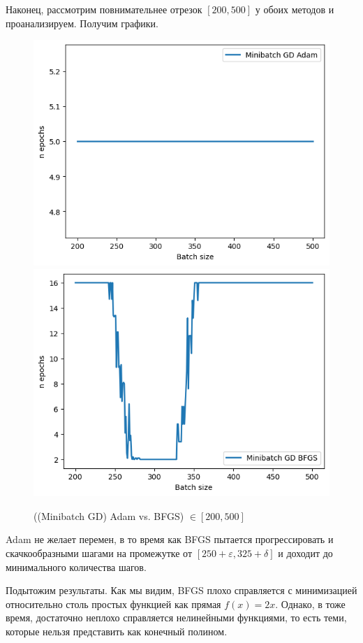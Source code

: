 \documentclass[12pt, a4paper, oneside, final]{article}
\begin{document}
	Наконец, рассмотрим повнимательнее отрезок $[200, 500]$ у обоих методов и проанализируем.
	Получим графики.
	\begin{figure}[H]
		\centering
		\includegraphics[scale = 0.75]{Image/T2_ADAM_200_500.png}
		\includegraphics[scale = 0.75]{Image/T2_BFGS_200_500.png}
		\caption*{((Minibatch GD) Adam vs. BFGS) $\in [200, 500]$}
	\end{figure}
	Adam не желает перемен, в то время как BFGS пытается прогрессировать и скачкообразными шагами на промежутке от $[250 + \varepsilon, 325 + \delta]$ и доходит до минимального количества шагов.

	Подытожим результаты.
	Как мы видим, BFGS плохо справляется с минимизацией относительно столь простых функцией как прямая $f(x) = 2x$.
	Однако, в тоже время, достаточно неплохо справляется нелинейными функциями, то есть теми, которые нельзя представить как конечный полином.
	\newpage
\end{document}
